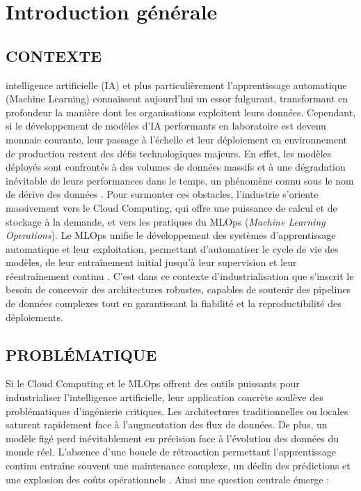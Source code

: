 \chapter*{Introduction générale}
\label{chap:introduction}
\adjustmtc

\section*{CONTEXTE}
intelligence artificielle (IA) et plus particulièrement l'apprentissage automatique (Machine Learning) connaissent aujourd'hui un essor fulgurant, transformant en profondeur la manière dont les organisations exploitent leurs données. Cependant, si le développement de modèles d'IA performants en laboratoire est devenu monnaie courante, leur passage à l'échelle et leur déploiement en environnement de production restent des défis technologiques majeurs. En effet, les modèles déployés sont confrontés à des volumes de données massifs et à une dégradation inévitable de leurs performances dans le temps, un phénomène connu sous le nom de dérive des données \cite{1}. Pour surmonter ces obstacles, l'industrie s'oriente massivement vers le Cloud Computing, qui offre une puissance de calcul et de stockage à la demande, et vers les pratiques du MLOps (\textit{Machine Learning Operations}). Le MLOps unifie le développement des systèmes d'apprentissage automatique et leur exploitation, permettant d'automatiser le cycle de vie des modèles, de leur entraînement initial jusqu'à leur supervision et leur réentraînement continu \cite{1}. C'est dans ce contexte d'industrialisation que s'inscrit le besoin de concevoir des architectures robustes, capables de soutenir des pipelines de données complexes tout en garantissant la fiabilité et la reproductibilité des déploiements.

\section*{PROBLÉMATIQUE}
Si le Cloud Computing et le MLOps offrent des outils puissants pour industrialiser l'intelligence artificielle, leur application concrète soulève des problématiques d'ingénierie critiques. Les architectures traditionnelles ou locales saturent rapidement face à l'augmentation des flux de données. De plus, un modèle figé perd inévitablement en précision face à l'évolution des données du monde réel. L'absence d'une boucle de rétroaction permettant l'apprentissage continu entraîne souvent une maintenance complexe, un déclin des prédictions et une explosion des coûts opérationnels \cite{1}. Ainsi une question centrale émerge :
\vspace{2mm}


